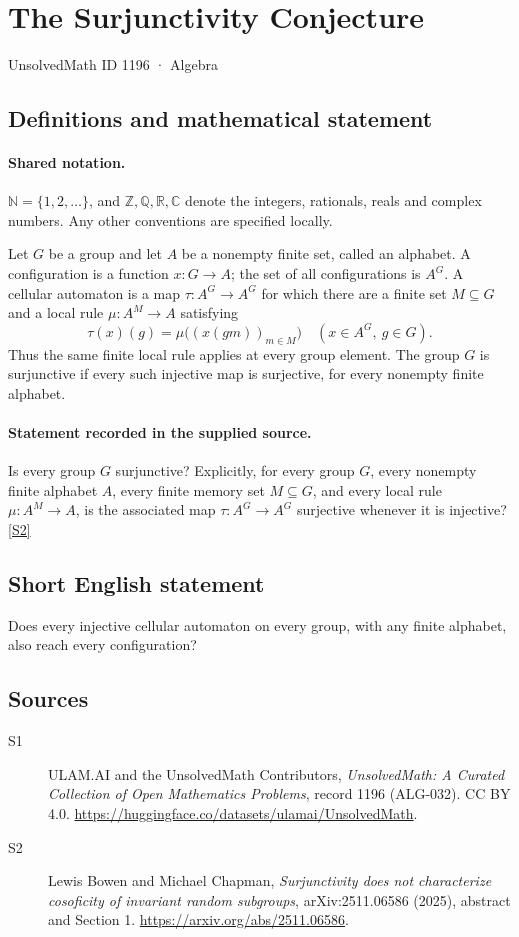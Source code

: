 \documentclass[11pt]{article}
\newcommand{\sref}[2]{\hyperlink{source:#1:#2}{[S#2]}}
\begin{document}
\setcounter{section}{1195}
\section{The Surjunctivity Conjecture}\label{1196}
{\small\sffamily UnsolvedMath ID 1196 · Algebra}
\subsection{Definitions and mathematical statement}

\paragraph{Shared notation.}$\mathbb N=\{1,2,\ldots\}$, and $\mathbb Z,\mathbb Q,\mathbb R,\mathbb C$ denote the integers, rationals, reals and complex numbers. Any other conventions are specified locally.


Let \(G\) be a group and let \(A\) be a nonempty finite set, called
an alphabet.  A configuration is a function \(x:G\to A\); the set of all
configurations is \(A^G\).  A cellular automaton is a map
\(\tau:A^G\to A^G\) for which there are a finite set \(M\subseteq G\)
and a local rule \(\mu:A^M\to A\) satisfying
\[
 \tau(x)(g)=\mu\bigl((x(gm))_{m\in M}\bigr)
       \quad (x\in A^G,\ g\in G).
\]
Thus the same finite local rule applies at every group element.
The group \(G\) is surjunctive if every such injective map is surjective,
for every nonempty finite alphabet.
\paragraph{Statement recorded in the supplied source.}
Is every group \(G\) surjunctive?  Explicitly, for every group
\(G\), every nonempty finite alphabet \(A\), every finite memory set
\(M\subseteq G\), and every local rule \(\mu:A^M\to A\), is the
associated map \(\tau:A^G\to A^G\) surjective whenever it is injective? \sref{1196}{2}
\subsection{Short English statement}
Does every injective cellular automaton on every group, with any finite alphabet, also reach every configuration?
\subsection{Sources}
\begin{description}
\item[\hypertarget{source:1196:1}{S1}] ULAM.AI and the UnsolvedMath Contributors, \emph{UnsolvedMath: A Curated Collection of Open Mathematics Problems}, record 1196 (ALG-032). CC BY 4.0. \url{https://huggingface.co/datasets/ulamai/UnsolvedMath}.
\item[\hypertarget{source:1196:2}{S2}] Lewis Bowen and Michael Chapman, \emph{Surjunctivity does not characterize cosoficity of invariant random subgroups}, arXiv:2511.06586 (2025), abstract and Section 1. \url{https://arxiv.org/abs/2511.06586}.
\end{description}
\label{end:1196}
\end{document}
